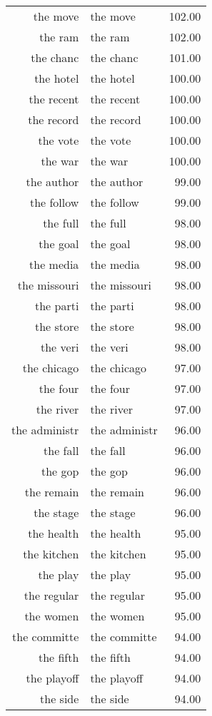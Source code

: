 \begin{table}[ht]
\begin{tabular}{rlr}
  the move & the move & 102.00 \\ 
  the ram & the ram & 102.00 \\ 
  the chanc & the chanc & 101.00 \\ 
  the hotel & the hotel & 100.00 \\ 
  the recent & the recent & 100.00 \\ 
  the record & the record & 100.00 \\ 
  the vote & the vote & 100.00 \\ 
  the war & the war & 100.00 \\ 
  the author & the author & 99.00 \\ 
  the follow & the follow & 99.00 \\ 
  the full & the full & 98.00 \\ 
  the goal & the goal & 98.00 \\ 
  the media & the media & 98.00 \\ 
  the missouri & the missouri & 98.00 \\ 
  the parti & the parti & 98.00 \\ 
  the store & the store & 98.00 \\ 
  the veri & the veri & 98.00 \\ 
  the chicago & the chicago & 97.00 \\ 
  the four & the four & 97.00 \\ 
  the river & the river & 97.00 \\ 
  the administr & the administr & 96.00 \\ 
  the fall & the fall & 96.00 \\ 
  the gop & the gop & 96.00 \\ 
  the remain & the remain & 96.00 \\ 
  the stage & the stage & 96.00 \\ 
  the health & the health & 95.00 \\ 
  the kitchen & the kitchen & 95.00 \\ 
  the play & the play & 95.00 \\ 
  the regular & the regular & 95.00 \\ 
  the women & the women & 95.00 \\ 
  the committe & the committe & 94.00 \\ 
  the fifth & the fifth & 94.00 \\ 
  the playoff & the playoff & 94.00 \\ 
  the side & the side & 94.00 \\ 

\end{tabular}
\end{table}
